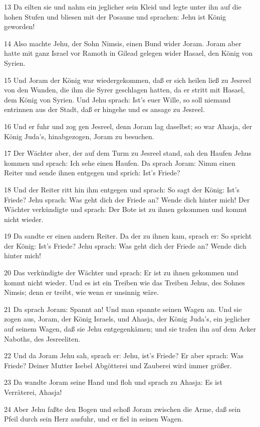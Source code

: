 \par 13 Da eilten sie und nahm ein jeglicher sein Kleid und legte unter ihn auf die hohen Stufen und bliesen mit der Posaune und sprachen: Jehu ist König geworden!
\par 14 Also machte Jehu, der Sohn Nimsis, einen Bund wider Joram. Joram aber hatte mit ganz Israel vor Ramoth in Gilead gelegen wider Hasael, den König von Syrien.
\par 15 Und Joram der König war wiedergekommen, daß er sich heilen ließ zu Jesreel von den Wunden, die ihm die Syrer geschlagen hatten, da er stritt mit Hasael, dem König von Syrien. Und Jehu sprach: Ist's euer Wille, so soll niemand entrinnen aus der Stadt, daß er hingehe und es ansage zu Jesreel.
\par 16 Und er fuhr und zog gen Jesreel, denn Joram lag daselbst; so war Ahasja, der König Juda's, hinabgezogen, Joram zu besuchen.
\par 17 Der Wächter aber, der auf dem Turm zu Jesreel stand, sah den Haufen Jehus kommen und sprach: Ich sehe einen Haufen. Da sprach Joram: Nimm einen Reiter und sende ihnen entgegen und sprich: Ist's Friede?
\par 18 Und der Reiter ritt hin ihm entgegen und sprach: So sagt der König: Ist's Friede? Jehu sprach: Was geht dich der Friede an? Wende dich hinter mich! Der Wächter verkündigte und sprach: Der Bote ist zu ihnen gekommen und kommt nicht wieder.
\par 19 Da sandte er einen andern Reiter. Da der zu ihnen kam, sprach er: So spricht der König: Ist's Friede? Jehu sprach: Was geht dich der Friede an? Wende dich hinter mich!
\par 20 Das verkündigte der Wächter und sprach: Er ist zu ihnen gekommen und kommt nicht wieder. Und es ist ein Treiben wie das Treiben Jehus, des Sohnes Nimsis; denn er treibt, wie wenn er unsinnig wäre.
\par 21 Da sprach Joram: Spannt an! Und man spannte seinen Wagen an. Und sie zogen aus, Joram, der König Israels, und Ahasja, der König Juda's, ein jeglicher auf seinem Wagen, daß sie Jehu entgegenkämen; und sie trafen ihn auf dem Acker Naboths, des Jesreeliten.
\par 22 Und da Joram Jehu sah, sprach er: Jehu, ist's Friede? Er aber sprach: Was Friede? Deiner Mutter Isebel Abgötterei und Zauberei wird immer größer.
\par 23 Da wandte Joram seine Hand und floh und sprach zu Ahasja: Es ist Verräterei, Ahasja!
\par 24 Aber Jehu faßte den Bogen und schoß Joram zwischen die Arme, daß sein Pfeil durch sein Herz ausfuhr, und er fiel in seinen Wagen.
